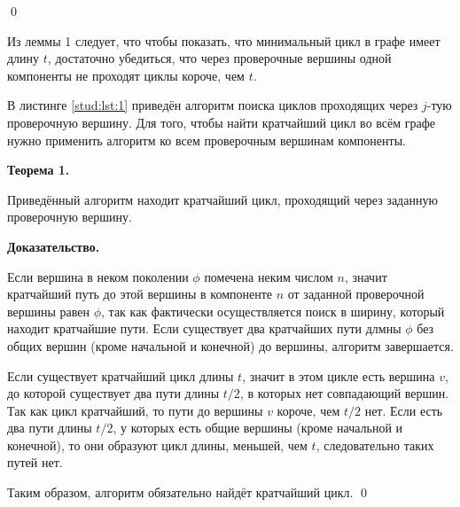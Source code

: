 \documentclass[14pt]{mmcs_article}
\begin{document}
\qed

Из леммы 1 следует, что чтобы показать, что минимальный цикл в графе имеет длину $t$, достаточно убедиться, что через проверочные вершины одной компоненты не проходят циклы короче, чем $t$.

В листинге \ref{stud:lst:1} приведён алгоритм поиска циклов проходящих через $j$-тую проверочную вершину. Для того, чтобы найти кратчайший цикл во всём графе нужно применить алгоритм ко всем проверочным вершинам компоненты.

\textbf{Теорема 1.}

Приведённый алгоритм находит кратчайший цикл, проходящий через заданную проверочную вершину.

\textbf{Доказательство.}

Если вершина в неком поколении $\phi$ помечена неким числом $n$, значит кратчайший путь до этой вершины в компоненте $n$ от заданной проверочной вершины равен $\phi$, так как фактически осуществляется поиск в ширину, который находит кратчайшие пути. Если существует два кратчайших пути длмны $\phi$ без общих вершин (кроме начальной и конечной) до вершины, алгоритм завершается.

Если существует кратчайший цикл длины $t$, значит в этом цикле есть вершина $v$, до которой существует два пути длины $t / 2$, в которых нет совпадающий вершин. Так как цикл кратчайший, то пути до вершины $v$ короче, чем $t / 2$ нет. Если есть два пути длины $t / 2$, у которых есть общие вершины (кроме начальной и конечной), то они образуют цикл длины, меньшей, чем $t$, следовательно таких путей нет.

Таким образом, алгоритм обязательно найдёт кратчайший цикл. \qed
\end{document}
